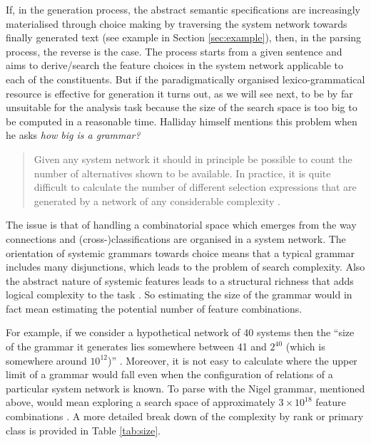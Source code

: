     If, in the generation process, the abstract semantic specifications are increasingly materialised through choice making by traversing the system network towards finally generated text (see example in Section \ref{sec:example}), then, in the parsing process, the reverse is the case. The process starts from a given sentence and aims to derive/search the feature choices in the system network applicable to each of the constituents. But if the paradigmatically organised lexico-grammatical resource is effective for generation it turns out, as we will see next, to be by far unsuitable for the analysis task because the size of the search space is too big to be computed in a reasonable time.
    Halliday himself mentions this problem when he asks \textit{how big is a grammar?}
    
    \begin{quote}
        Given any system network it should in principle be possible to count the number of alternatives shown to be available. In practice, it is quite difficult to calculate the number of different selection expressions that are generated by a network of any considerable complexity \citep[10]{Halliday96-grammatics}.
    \end{quote}
    
    The issue is that of handling a combinatorial space which emerges from the way connections and (cross-)classifications are organised in a system network. The orientation of systemic grammars towards choice means that a typical grammar includes many disjunctions, which leads to the problem of search complexity. Also the abstract nature of systemic features leads to a structural richness that adds logical complexity to the task \citep{ODonnell1993}. So estimating the size of the grammar would in fact mean estimating the potential number of feature combinations.
    
    For example, if we consider a hypothetical network of 40 systems then the ``size of the grammar it generates lies somewhere between 41 and $2^{40}$ (which is somewhere around $10^{12}$)'' \citep[28]{Bateman2008}. Moreover, it is not easy to calculate where the upper limit of a grammar would fall even when the configuration of relations of a particular system network is known. %
    To parse with the Nigel grammar, mentioned above, would mean exploring a search space of approximately $3 \times 10^{18} $ feature combinations \citep[35]{Bateman2008}. A more detailed break down of the complexity by rank or primary class is provided in Table \ref{tab:size}.
    
